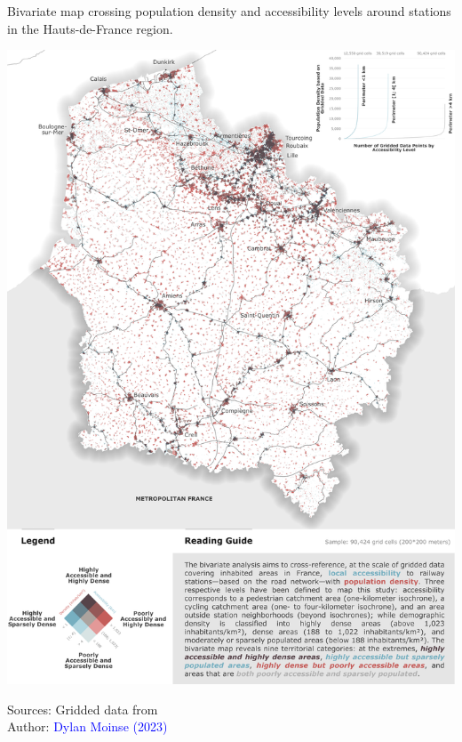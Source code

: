 \begin{refsegment}
    \begin{carte}[h!]\vspace*{4pt}
        \caption{Bivariate map crossing population density and accessibility levels around stations in the Hauts-de-France region.}
        \label{fig-chap5:carte-bivariee-accessibilite-densite}
        \centerline{\includegraphics[width=1\columnwidth]{src/Figures/Chap-5/EN_Distances_Carte_bivariee_accessibilite_densite.png}}
        \vspace{5pt}
        \begin{flushright}\scriptsize{
        Sources: Gridded data from \textcolor{blue}{\textcite{insee_grille_2021}}
        \\
        Author: \textcolor{blue}{Dylan Moinse (2023)}
        }\end{flushright}
    \end{carte}


\end{refsegment}
